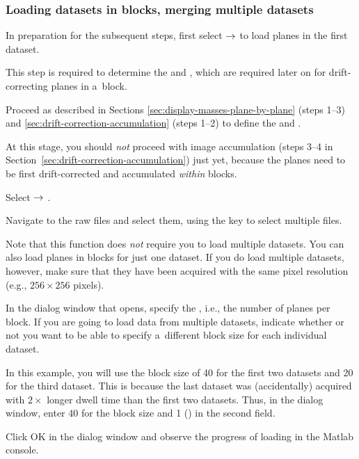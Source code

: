 \subsubsection{Loading datasets in blocks, merging multiple datasets}
\setcounter{step}{0}

\s In preparation for the subsequent steps, first select  $\rightarrow$  to load  planes in the first dataset.

\bul This step is required to determine the  and , which are required later on for drift-correcting planes in a~block.

\s Proceed as described in Sections \ref{sec:display-masses-plane-by-plane} (steps 1--3) and \ref{sec:drift-correction-accumulation} (steps 1--2) to define the  and .

\bul At this stage, you should \emph{not} proceed with image accumulation (steps 3--4 in Section~\ref{sec:drift-correction-accumulation}) just yet, because the planes need to be first drift-corrected and accumulated \emph{within} blocks.

\s Select  $\rightarrow$ . 

\bul Navigate to the raw files and select them, using the  key to select multiple files.

\bul Note that this function does \emph{not} require you to load multiple datasets. You can also load planes in blocks for just one dataset. If you do load multiple datasets, however, make sure that they have been acquired with the same pixel resolution (e.g., $256\times 256$ pixels).

\s In the dialog window that opens, specify the , i.e., the number of planes per block. If you are going to load data from multiple datasets, indicate whether or not you want to be able to specify a~different block size for each individual dataset.

\bul In this example, you will use the block size of 40 for the first two datasets and 20 for the third dataset. This is because the last dataset was (accidentally) acquired with $2\times$ longer dwell time than the first two datasets. Thus, in the dialog window, enter 40 for the block size and 1 () in the second field.

\s Click OK in the dialog window and observe the progress of loading in the Matlab console.

